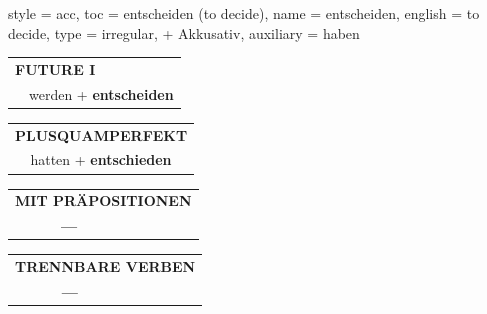 \begin{verbentry}{
  style = {acc},
  toc = {entscheiden (to decide)},
  name = {entscheiden},
  english = {to decide},
  type = {irregular, + Akkusativ},
  auxiliary = {haben}
}
\begin{tabular}{rl}
    \multicolumn{2}{l}{\textbf{FUTURE I} }\\
  &  werden + \textbf{entscheiden}\\
 
  \end{tabular}
\hfill
   \begin{tabular}{rl}
      \multicolumn{2}{l}{\textbf{PLUSQUAMPERFEKT}}\\
  &  hatten + \textbf{entschieden}\\
  \end{tabular}
  
   \vspace{10pt}

\begin{tabular}{lll}
\multicolumn{3}{l}{\textbf{MIT PRÄPOSITIONEN}}\\
& \textbf{---} & \\
\end{tabular}
\hfill
\begin{tabular}{lll}
\multicolumn{3}{l}{\textbf{TRENNBARE VERBEN}}\\
& \textbf{---} & \\
\end{tabular}

  \vspace{-5pt}
\end{verbentry}

